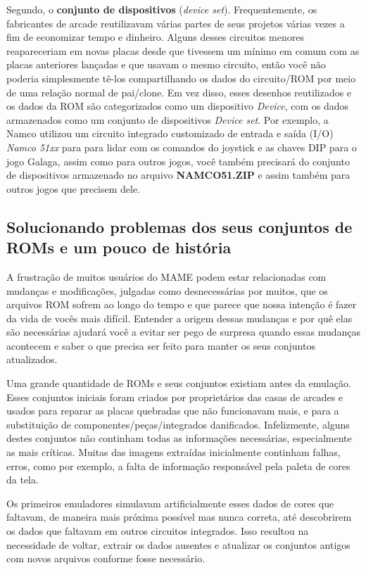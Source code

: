 \documentclass[letterpaper,10pt,brazil]{sphinxmanual}
\begin{document}
Segundo, o \textbf{conjunto de dispositivos} (\emph{device set}).
Frequentemente, os fabricantes de arcade reutilizavam várias partes de
seus projetos várias vezes a fim de economizar tempo e dinheiro. Alguns
desses circuitos menores reapareceriam em novas placas desde que
tivessem um mínimo em comum com as placas anteriores lançadas e que
usavam o mesmo circuito, então você não poderia simplesmente tê-los
compartilhando os dados do circuito/ROM por meio de uma relação normal
de pai/clone. Em vez disso, esses desenhos reutilizados e os dados da
ROM são categorizados como um dispositivo \emph{Device}, com os dados
armazenados como um conjunto de dispositivos \emph{Device set}. Por exemplo,
a Namco utilizou um circuito integrado customizado de entrada e saída
(I/O) \emph{Namco 51xx} para para lidar com os comandos do joystick e as
chaves DIP para o jogo Galaga, assim como para outros jogos, você também
precisará do conjunto de dispositivos armazenado no arquivo
\textbf{NAMCO51.ZIP} e assim também para outros jogos que precisem dele.


\subsection{Solucionando problemas dos seus conjuntos de ROMs e um pouco de história}
\label{usingmame/aboutromsets:solucionando-problemas-dos-seus-conjuntos-de-roms-e-um-pouco-de-historia}
A frustração de muitos usuários do MAME podem estar relacionadas com
mudanças e modificações, julgadas como desnecessárias por muitos, que os
arquivos ROM sofrem ao longo do tempo e que parece que nossa intenção é
fazer da vida de vocês mais difícil. Entender a origem dessas mudanças e
por quê elas são necessárias ajudará você a evitar ser pego de surpresa
quando essas mudanças acontecem e saber o que precisa ser feito para
manter os seus conjuntos atualizados.

Uma grande quantidade de ROMs e seus conjuntos existiam antes da
emulação. Esses conjuntos iniciais foram criados por proprietários das
casas de arcades e usados para reparar as placas quebradas que não
funcionavam mais, e para a substituição de componentes/peças/integrados
danificados. Infelizmente, alguns destes conjuntos não continham todas
as informações necessárias, especialmente as mais críticas. Muitas das
imagens extraídas inicialmente continham falhas, erros, como
por exemplo, a falta de informação responsável pela paleta de cores da
tela.

Os primeiros emuladores simulavam artificialmente
esses dados de cores que faltavam, de maneira mais próxima possível mas
nunca correta, até descobrirem os dados que faltavam em outros circuitos
integrados. Isso resultou na necessidade de voltar, extrair os dados
ausentes e atualizar os conjuntos antigos com novos arquivos conforme
fosse necessário.
\end{document}
